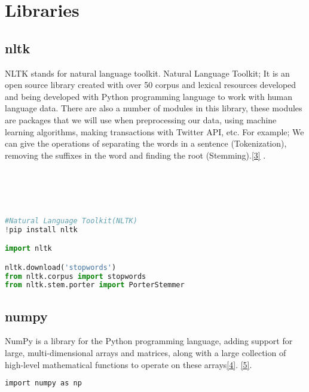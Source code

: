 \documentclass[onecolumn]{article}
\begin{document}
\section{Libraries}

\subsection{nltk}

NLTK stands for natural language toolkit. Natural Language Toolkit; It is an open source library created with over 50 corpus and lexical resources developed and being developed with Python programming language to work with human language data. There are also a number of modules in this library, these modules are packages that we will use when preprocessing our data, using machine learning algorithms, making transactions with Twitter API, etc. For example; We can give the operations of separating the words in a sentence (Tokenization), removing the suffixes in the word and finding the root (Stemming).\href{https://www.veribilimiokulu.com/natural-language-toolkitnltk/}{ {[3]}}
.\\\\\\\\\\

\begin{lstlisting}[language=Python, caption= nltk]
#Natural Language Toolkit(NLTK)
!pip install nltk

import nltk

nltk.download('stopwords')
from nltk.corpus import stopwords
from nltk.stem.porter import PorterStemmer
\end{lstlisting}

\subsection{numpy}

NumPy is a library for the Python programming language, adding support for large, multi-dimensional arrays and matrices, along with a large collection of high-level mathematical functions to operate on these arrays\href{https://www.w3schools.com/python/numpy/numpy_intro.asp}{ {[4]}}.   \href{https://en.wikipedia.org/wiki/NumPy}{ {[5]}}.

\begin{lstlisting}[language=C, caption= numpy]
import numpy as np
\end{lstlisting}
\end{document}
